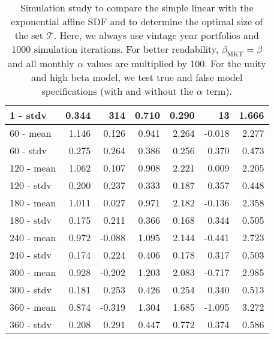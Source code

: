 \documentclass[12pt]{article}
\begin{document}
\begin{table}[ht]
\begin{tabular}{lrrrrrr}
		1 - stdv & 0.344 & 314 & 0.710 & 0.290 & 13 & 1.666 \\ 
		\hline
		60 - mean & 1.146 & 0.126 & 0.941 & 2.264 & -0.018 & 2.277 \\ 
		60 - stdv & 0.275 & 0.264 & 0.386 & 0.256 & 0.370 & 0.473 \\ 
		\hline
		120 - mean & 1.062 & 0.107 & 0.908 & 2.221 & 0.009 & 2.205 \\ 
		120 - stdv & 0.200 & 0.237 & 0.333 & 0.187 & 0.357 & 0.448 \\ 
		\hline
		180 - mean & 1.011 & 0.027 & 0.971 & 2.182 & -0.136 & 2.358 \\ 
		180 - stdv & 0.175 & 0.211 & 0.366 & 0.168 & 0.344 & 0.505 \\ 
		\hline
		240 - mean & 0.972 & -0.088 & 1.095 & 2.144 & -0.441 & 2.723 \\ 
		240 - stdv & 0.174 & 0.224 & 0.406 & 0.178 & 0.317 & 0.503 \\ 
		\hline
		300 - mean & 0.928 & -0.202 & 1.203 & 2.083 & -0.717 & 2.985 \\ 
		300 - stdv & 0.181 & 0.253 & 0.426 & 0.254 & 0.340 & 0.513 \\ 
		\hline
		360 - mean & 0.874 & -0.319 & 1.304 & 1.685 & -1.095 & 3.272 \\ 
		360 - stdv & 0.208 & 0.291 & 0.447 & 0.772 & 0.374 & 0.586 \\ 
		\hline
		\hline
	\end{tabular}
	\caption{
		Simulation study to compare the simple linear with the exponential affine SDF and to determine the optimal size of the set $\mathcal{T}$.
		Here, we always use vintage year portfolios and 1000 simulation iterations.
		For better readability, $\beta_{\mathrm{MKT}}=\beta$ and all monthly $\alpha$ values are multiplied by 100.
		For the unity and high beta model, we test true and false model specifications (with and without the $\alpha$ term).
	} 
	\label{tab:simulation_study}
\end{table}
\end{document}
